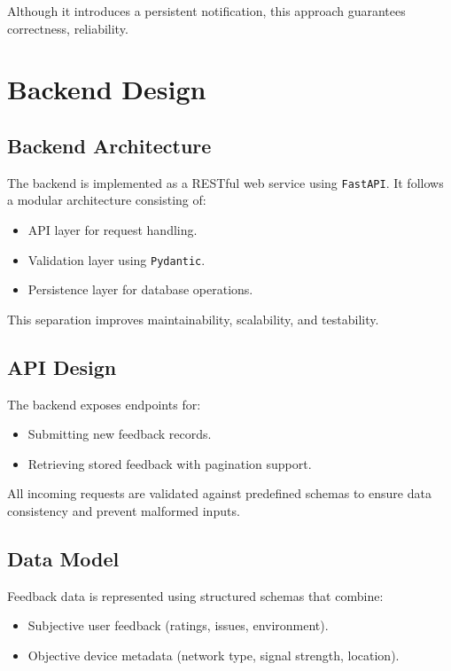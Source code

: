 \documentclass{article}
\begin{document}
Although it introduces a persistent notification, this approach guarantees correctness, reliability.


\section{Backend Design}

\subsection{Backend Architecture}

The backend is implemented as a RESTful web service using \texttt{FastAPI}. It follows a modular architecture consisting of:

\begin{itemize}
    \item API layer for request handling.
    \item Validation layer using \texttt{Pydantic}.
    \item Persistence layer for database operations.
\end{itemize}

This separation improves maintainability, scalability, and testability.

\subsection{API Design}

The backend exposes endpoints for:
\begin{itemize}
    \item Submitting new feedback records.
    \item Retrieving stored feedback with pagination support.
\end{itemize}

All incoming requests are validated against predefined schemas to ensure data consistency and prevent malformed inputs.

\subsection{Data Model}

Feedback data is represented using structured schemas that combine:
\begin{itemize}
    \item Subjective user feedback (ratings, issues, environment).
    \item Objective device metadata (network type, signal strength, location).
\end{itemize}
\end{document}

